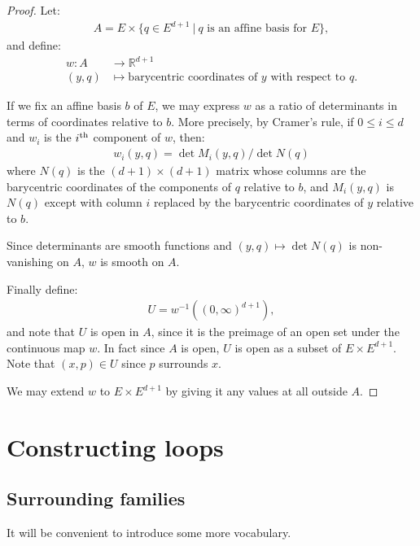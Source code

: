 \begin{proof}
  \leanok
  Let:
  \begin{align*}
    A = E \times \{ q \in E^{d+1} ~|~ \mbox{$q$ is an affine basis for $E$} \},
  \end{align*}
  and define:
  \begin{align*}
    w : A &\to ℝ^{d+1}\\
    (y, q) &\mapsto \mbox{barycentric coordinates of $y$ with respect to $q$}.
  \end{align*}

  If we fix an affine basis $b$ of $E$, we may express $w$ as a
  ratio of determinants in terms of coordinates relative to $b$. More precisely,
  by Cramer's rule, if $0 \le i \le d$ and $w_i$ is the $i^{\rm th}$ component of $w$,
  then:
  \begin{align*}
    w_i (y, q) = \det M_i (y, q) / \det N (q)
  \end{align*}
  where $N(q)$ is the $(d+1)\times (d+1)$ matrix whose columns are the barycentric
  coordinates of the components of $q$ relative to $b$, and $M_i (y, q)$ is $N(q)$
  except with column $i$ replaced by the barycentric coordinates of $y$ relative
  to $b$.

  Since determinants are smooth functions and $(y, q) \mapsto \det N(q)$ is
  non-vanishing on $A$, $w$ is smooth on $A$.

  Finally define:
  \begin{align*}
    U = w^{-1}((0, \infty)^{d+1}),
  \end{align*}
  and note that $U$ is open in $A$, since it is the preimage of an open set under the
  continuous map $w$. In fact since $A$ is open, $U$ is open as a subset of $E \times E^{d+1}$.
  Note that $(x, p) \in U$ since $p$ surrounds $x$.

  We may extend $w$ to $E \times E^{d+1}$ by giving it any values at all outside $A$.
\end{proof}

\section{Constructing loops}

\subsection{Surrounding families}
\label{sub:surrounding_families}

It will be convenient to introduce some more vocabulary.

